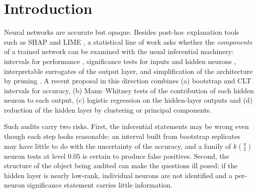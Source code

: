 \documentclass[11pt,a4paper]{article}
\theoremstyle{remark}\newtheorem{remark}{Remark}
\begin{document}
\section{Introduction}
Neural networks are accurate but opaque. Besides post-hoc explanation tools such as SHAP and LIME \cite{lundberg2017,ribeiro2016}, a statistical line of work asks whether the \emph{components} of a trained network can be examined with the usual inferential machinery: intervals for performance \cite{white2001}, significance tests for inputs and hidden neurons \cite{horel2020,olden2002}, interpretable surrogates of the output layer, and simplification of the architecture by pruning \cite{blalock2020,hoefler2021}. A recent proposal in this direction \cite{almohamad2024} combines (a) bootstrap and CLT intervals for accuracy, (b) Mann--Whitney tests of the contribution of each hidden neuron to each output, (c) logistic regression on the hidden-layer outputs and (d) reduction of the hidden layer by clustering or principal components.

Such audits carry two risks. First, the inferential statements may be wrong even though each step looks reasonable: an interval built from bootstrap replicates may have little to do with the uncertainty of the accuracy, and a family of $k\binom q2$ neuron tests at level $0.05$ is certain to produce false positives. Second, the structure of the object being audited can make the questions ill posed: if the hidden layer is nearly low-rank, individual neurons are not identified and a per-neuron significance statement carries little information.
\end{document}
